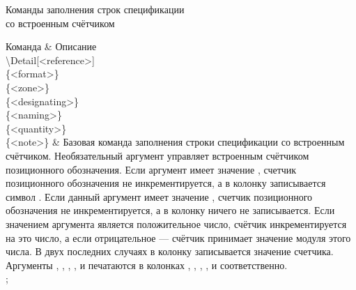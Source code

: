 \begin{tikztablex}
{
\caption{Команды заполнения строк спецификации\\со встроенным счётчиком}
\label{tabular:speclines2}
}
{
Команда & Описание\\
{\textbackslash{}Detail[<reference>]\\
\{<format>\}\\
\{<zone>\}\\
\{<designating>\}\\
\{<naming>\}\\
\{<quantity>\}\\
\{<note>\}}
& Базовая команда заполнения строки спецификации со встроенным
счётчиком. Необязательный аргумент  управляет встроенным счётчиком
позиционного обозначения. Если аргумент  имеет значение \sfemph{-},
счетчик позиционного обозначения не инкрементируется, а в колонку
\colorbox{resultcolor}{} записывается символ \sfemph{-}. Если данный
аргумент имеет значение , счетчик позиционного обозначения не
инкрементируется, а в колонку \colorbox{resultcolor}{} ничего не записывается. Если значением
аргумента является положительное число, счётчик инкрементируется на это число, а если
отрицательное --- счётчик принимает значение модуля этого числа. В двух последних
случаях в колонку {} записывается значение счетчика. Аргументы
, , , ,
 и  печатаются в колонках
\colorbox{resultcolor}{},
\colorbox{resultcolor}{},
\colorbox{resultcolor}{},
\colorbox{resultcolor}{}, \colorbox{resultcolor}{} и
\colorbox{resultcolor}{} соответственно.\\
};
\end{tikztablex}

\clearpage
